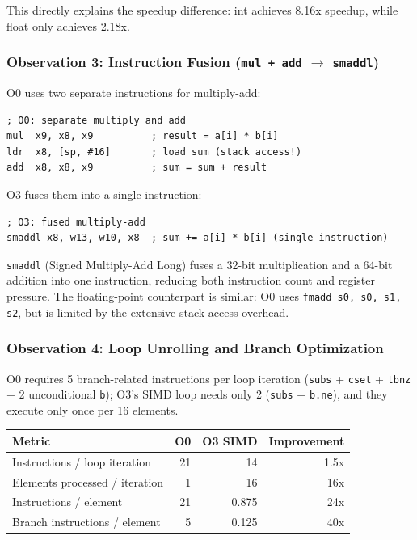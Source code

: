 \documentclass[12pt,a4paper]{article}
\begin{document}
This directly explains the speedup difference: int achieves 8.16x speedup, while float only achieves 2.18x.

\subsubsection{Observation 3: Instruction Fusion (\texttt{mul + add} $\to$ \texttt{smaddl})}

O0 uses two separate instructions for multiply-add:

\begin{lstlisting}
; O0: separate multiply and add
mul  x9, x8, x9          ; result = a[i] * b[i]
ldr  x8, [sp, #16]       ; load sum (stack access!)
add  x8, x8, x9          ; sum = sum + result
\end{lstlisting}

O3 fuses them into a single instruction:

\begin{lstlisting}
; O3: fused multiply-add
smaddl x8, w13, w10, x8  ; sum += a[i] * b[i] (single instruction)
\end{lstlisting}

\texttt{smaddl} (Signed Multiply-Add Long) fuses a 32-bit multiplication and a 64-bit addition into one instruction, reducing both instruction count and register pressure. The floating-point counterpart is similar: O0 uses \texttt{fmadd s0, s0, s1, s2}, but is limited by the extensive stack access overhead.

\subsubsection{Observation 4: Loop Unrolling and Branch Optimization}

O0 requires 5 branch-related instructions per loop iteration (\texttt{subs} + \texttt{cset} + \texttt{tbnz} + 2 unconditional \texttt{b}); O3's SIMD loop needs only 2 (\texttt{subs} + \texttt{b.ne}), and they execute only once per 16 elements.

\begin{table}[H]
\centering
\begin{tabular}{l r r r}
\toprule
Metric & O0 & O3 SIMD & Improvement \\
\midrule
Instructions / loop iteration & 21 & 14 & 1.5x \\
Elements processed / iteration & 1 & 16 & 16x \\
Instructions / element & 21 & 0.875 & 24x \\
Branch instructions / element & 5 & 0.125 & 40x \\
\bottomrule
\end{tabular}
\end{table}
\end{document}
